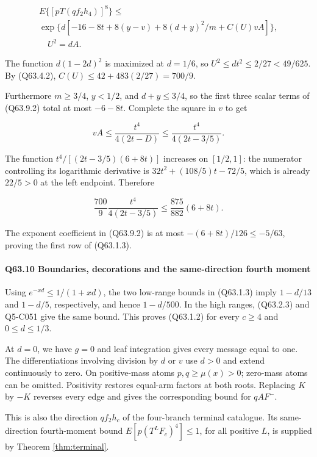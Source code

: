 \[
\begin{gathered}
E\{[pT(qf_2h_4)]^8\}\le\\
\exp\{d[-16-8t+8(y-v)+8(d+y)^2/m+C(U)vA]\},\\
\quad U^2=dA.
\end{gathered}\tag{Q63.9.2}\label{eq:Q63:Q63:9:2}
\]

The function $d(1-2d)^2$ is maximized at $d=\allowbreak 1/6$, so $U^2\le\allowbreak  dt^2\le\allowbreak 2/27<\allowbreak 49/625$.
By (Q63.4.2), $C(U)\le\allowbreak 42+483(2/27)=\allowbreak 700/9$.

Furthermore $m\ge\allowbreak 3/4$, $y<\allowbreak 1/2$, and $d+y\le\allowbreak 3/4$, so the first three scalar terms of (Q63.9.2) total at most
$-6-8t$. Complete the square in $v$ to get

\[
vA\le\frac{t^4}{4(2t-D)}\le\frac{t^4}{4(2t-3/5)}.
\]

The function $t^4/[(2t-3/5)(6+8t)]$ increases on $[1/2,\allowbreak  1]$: the numerator controlling its logarithmic derivative is
$32t^2+(108/5)t-72/5$, which is already $22/5>\allowbreak 0$ at the left endpoint.
Therefore

\[
\frac{700}{9}\frac{t^4}{4(2t-3/5)}
\le\frac{875}{882}(6+8t).
\]

The exponent coefficient in (Q63.9.2) is at most $-(6+8t)/126\le\allowbreak -5/63$, proving the first row of (Q63.1.3).

\paragraph{Q63.10 Boundaries, decorations and the same-direction fourth moment}

Using $e^{-xd}\le\allowbreak 1/(1+xd)$, the two low-range bounds in (Q63.1.3) imply $1-d/13$ and $1-d/5$, respectively,
and hence $1-d/500$. In the high ranges, (Q63.2.3) and Q5-C051 give the same bound.
This proves (Q63.1.2) for every $c\ge\allowbreak 4$ and $0\le\allowbreak  d\le\allowbreak 1/3$.

At $d=\allowbreak 0$, we have $g=\allowbreak 0$ and leaf integration gives every message equal to one.
The differentiations involving division by $d$ or $v$ use $d>\allowbreak 0$ and extend continuously to zero. On positive-mass atoms $p,\allowbreak  q\ge\allowbreak \mu(x)>\allowbreak 0$;
zero-mass atoms can be omitted.
Positivity restores equal-arm factors at both roots. Replacing $K$ by $-K$ reverses every edge
and gives the corresponding bound for $qAF^-$.

This is also the direction $qf_2h_c$ of the four-branch terminal catalogue.
Its same-direction fourth-moment bound $E[p(T^LF_c)^4]\le\allowbreak 1$, for all positive $L$, is supplied by Theorem \ref{thm:terminal}.

